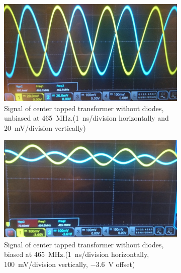 \begin{figure}[ht]
	\centering
	\begin{subfigure}{0.4\textwidth}
		\centering
		\includegraphics[width=\textwidth]{Chapters/Deflection/unbiased3}
		\caption{Signal of center tapped transformer without diodes, unbiased at \SI{465}{\mega\hertz}.(\SI{1}{\nano\second}/division horizontally and \SI{20}{\milli\volt}/division vertically) }
		\label{fig:unbiased2}
	\end{subfigure}
	\hspace{0.1\textwidth}
	\begin{subfigure}{0.4\textwidth}
		\centering
		\includegraphics[width=\textwidth]{Chapters/Deflection/biased3}
		\caption{Signal of center tapped transformer without diodes, biased at \SI{465}{\mega\hertz}.(\SI{1}{\nano\second}/division horizontally, \SI{100}{\milli\volt}/division vertically, \SI{-3.6}{\volt} offset)}
		\label{fig:biased2}
	\end{subfigure}
	\caption{}
	\label{fig:CTTSignal}
\end{figure}



